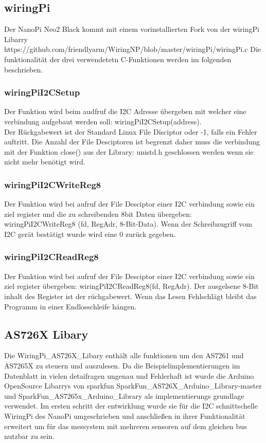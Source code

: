 \subsection{wiringPi}
Der NanoPi Neo2 Black kommt mit einem vorinstallierten Fork von der wiringPi Libarry
https://github.com/friendlyarm/WiringNP/blob/master/wiringPi/wiringPi.c
Die funktionalität der drei verwendetetn C-Funktionen werden im folgenden beschrieben.
\subsubsection{wiringPiI2CSetup}

Der Funktion wird beim audfruf die I2C Adresse übergeben mit welcher eine verbindung aufgebaut werden soll: wiringPiI2CSetup(address).\\
Der Rückgabewert ist der Standard Linux File Disciptor oder -1, falls ein Fehler auftritt. 
Die Anzahl der File Desciptoren ist begrenzt daher muss die verbindung mit der Funktion close() aus der Library: unistd.h geschlossen werden wenn sie nicht mehr benötigt wird.


\subsubsection{wiringPiI2CWriteReg8}
Der Funktion wird bei aufruf der File Desciptor einer I2C verbindung sowie ein ziel register und die zu schreibenden 8bit Daten übergeben: wiringPiI2CWriteReg8 (fd, RegAdr, 8-Bit-Data).
Wenn der Schreibzugriff vom I2C gerät bestätigt wurde wird eine 0 zurück gegeben.
\subsubsection{wiringPiI2CReadReg8}
Der Funktion wird bei aufruf der File Desciptor einer I2C verbindung sowie ein ziel register übergeben: wiringPiI2CReadReg8(fd, RegAdr).
Der ausgelsene 8-Bit inhalt des Register ist der rüchgabewert.
Wenn das Lesen Fehlschlägt bleibt das Programm in einer Endlosschleife hängen.

\subsection{AS726X Libary}
Die WiringPi\_AS726X\_Libary enthält alle funktionen um den AS7261 und AS7265X zu steuern und auszulesen.
Da die Beispielimplementierungen im Datenblatt in vielen detaifragen ungenau und Fehlerhaft ist wurde die Arduino OpenSource Libarrys von sparkfun SparkFun\_AS726X\_Arduino\_Library-master und SparkFun\_AS7265x\_Arduino\_Library als implementierungs grundlage verwendet.
Im ersten schritt der entwirklung wurde sie für die I2C schnittschelle WiringPi des NanoPi umgeschrieben und anschließen in ihrer Funktionalität erweitert um für das messystem mit mehreren sensoren auf dem gleichen bus nutzbar zu sein. \\

